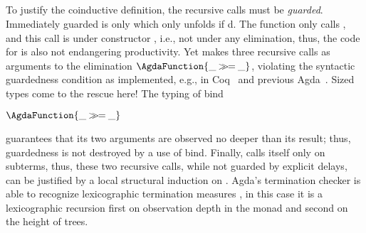 \documentclass[preliminary,copyright,creativecommons]{eptcs}
\newenvironment{code}{\verbatim}{\endverbatim}
\newcommand{\prebind}{\ensuremath{\AgdaFunction{\_\ensuremath{\mathbin{{>}\mkern-8.5mu{>}\mkern-2mu{=}}}\_}}}
\newcommand{\ie}{i.e.}
\begin{document}
\begin{code}
\\
\> \AgdaSymbol{(} \AgdaSymbol{)} \<[17]\>[17] \<[21]\>[21]\AgdaSymbol{=}  \AgdaSymbol{(} \AgdaSymbol{(}  \AgdaSymbol{))}\<\\
\> \AgdaSymbol{(}  \AgdaSymbol{)} \<[17]\>[17] \<[21]\>[21]\AgdaSymbol{=}  \AgdaSymbol{(}   \AgdaSymbol{)}\<\\
\\
\> \AgdaSymbol{(}   \AgdaSymbol{)} \<[21]\>[21]\AgdaSymbol{=}   \AgdaSymbol{(} \AgdaInductiveConstructor{,} \AgdaSymbol{)}\<\end{code}

\noindent
To justify the coinductive definition, the recursive calls must be
\emph{guarded}.  Immediately guarded is only  which
only unfolds if d.  The  function
only calls
, and this call is under constructor
, \ie, not under any elimination,
thus, the code for  is also not endangering
productivity.   Yet  makes three recursive calls as
arguments to the elimination \prebind{}, violating the syntactic
guardedness condition \cite{coquand:infiniteobjects,gimenez:guardeddefinitions}
as implemented, e.g., in Coq~\cite{inria:coq84} and previous Agda~\cite{altenkirchDanielsson:par10}.  Sized types come to the
rescue here!  The typing of bind
\begin{center}
\AgdaCodeStyle
\begin{ptboxed}
\>[4]\prebind{} \<[23]\>[23]\AgdaSymbol{:} \<[26]\>[26] \AgdaSymbol{\{}  \AgdaSymbol{\}}      \AgdaSymbol{(}    \AgdaSymbol{)}    \<\end{ptboxed}  
\end{center}
guarantees that its two arguments are observed no deeper than its
result; thus, guardedness is not destroyed by a use of bind.  Finally,
 calls itself only on subterms, thus, these two
recursive calls, while not guarded by explicit delays,  
can be justified by a local structural induction on
.  Agda's termination checker is able to recognize
lexicographic termination measures \cite{abelAltenkirch:jfp02}, in this case
it is a lexicographic recursion first on observation depth in the
 monad and second on the height of
 trees.
\end{document}
